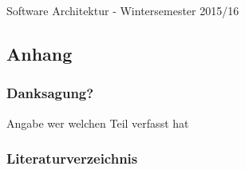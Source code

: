\documentclass[]{article}
\begin{document}
Software Architektur - Wintersemester 2015/16
















\subsection{Anhang}\label{anhang}

\subsubsection{Danksagung?}\label{danksagung}

Angabe wer welchen Teil verfasst hat

\subsubsection{Literaturverzeichnis}\label{literaturverzeichnis}
\end{document}
